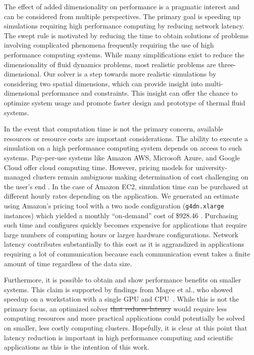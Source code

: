 \documentclass[mca,article,submit,moreauthors,pdftex]{Definitions/mdpi}
\newcommand{\former}[2]{\sloppy\cbcolor{#2}\textcolor{#2}{\cbdelete\sout{#1}}}
\begin{document}
The effect of added dimensionality on performance is a pragmatic interest and can be considered from multiple perspectives. The primary goal is speeding up simulations requiring high performance computing by reducing network latency. The swept rule is motivated by reducing the time to obtain solutions of problems involving complicated phenomena frequently requiring the use of high performance computing systems. While many simplifications exist to reduce the dimensionality of fluid dynamics problems, most realistic problems are three-dimensional. Our solver is a step towards more realistic simulations by considering two spatial dimensions, which can provide insight into multi-dimensional performance and constraints. This insight can offer the chance to optimize system usage and promote faster design and prototype of thermal fluid systems.

In the event that computation time is not the primary concern, available resources or resource costs are important considerations. The ability to execute a simulation on a high performance computing system depends on access to such systems. Pay-per-use systems like Amazon AWS, Microsoft Azure, and Google Cloud offer cloud computing time. However, pricing models for university-managed clusters remain ambiguous making determination of cost challenging on the user's end \cite{mesnard_reproducible_2019}. 
In the case of Amazon EC2, simulation time can be purchased at different hourly rates depending on the application. We generated an estimate using Amazon's pricing tool with a two node configuration (\texttt{g4dn.xlarge} instances) which yielded a monthly ``on-demand'' cost of \$928.46 \cite{amazon_web_services_amazon_2021}. Purchasing such time and configures quickly becomes expensive for applications that require large numbers of computing hours or larger hardware configurations. Network latency contributes substantially to this cost as it is aggrandized in applications requiring a lot of communication because each communication event takes a finite amount of time regardless of the data size. 

Furthermore, it is possible to obtain and show performance benefits on smaller systems. This claim is supported by findings from Magee et al., who showed speedup on a workstation with a single GPU and CPU~\cite{magee_accelerating_2018}. While this is not the primary focus, an optimized solver \former{that reduces latency}{revTwo} would require less computing resources and more practical applications could potentially be solved on smaller, less costly computing clusters. Hopefully, it is clear at this point that latency reduction is important in high performance computing and scientific applications as this is the intention of this work.
\end{document}

